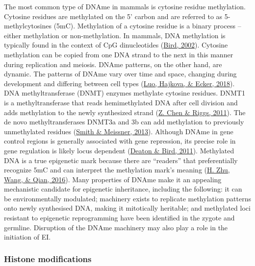 \documentclass[12pt,twoside]{reedthesis}
\begin{document}
The most common type of DNAme in mammals is cytosine residue
methylation. Cytosine residues are methylated on the 5' carbon and are
referred to as 5-methylcytosines (5mC). Methylation of a cytosine
residue is a binary process -- either methylation or non-methylation. In
mammals, DNA methylation is typically found in the context of CpG
dinucleotides (\protect\hyperlink{ref-bird2002}{Bird, 2002}). Cytosine methylation can be copied from one
DNA strand to the next in this manner during replication and meiosis.
DNAme patterns, on the other hand, are dynamic. The patterns of DNAme
vary over time and space, changing during development and differing
between cell types (\protect\hyperlink{ref-luo2018}{Luo, Hajkova, \& Ecker, 2018}). DNA methyltransferase (DNMT) enzymes
methylate cytosine residues. DNMT1 is a methyltransferase that reads
hemimethylated DNA after cell division and adds methylation to the newly
synthesized strand (\protect\hyperlink{ref-chen2011}{Z. Chen \& Riggs, 2011}). The de novo methyltransferases DNMT3a
and 3b can add methylation to previously unmethylated residues
(\protect\hyperlink{ref-smith2013}{Smith \& Meissner, 2013}). Although DNAme in gene control regions is generally
associated with gene repression, its precise role in gene regulation is
likely locus dependent (\protect\hyperlink{ref-deaton2011}{Deaton \& Bird, 2011}). Methylated DNA is a true
epigenetic mark because there are ``readers'' that preferentially
recognize 5mC and can interpret the methylation mark's meaning
(\protect\hyperlink{ref-zhu2016a}{H. Zhu, Wang, \& Qian, 2016}). Many properties of DNAme make it an appealing mechanistic
candidate for epigenetic inheritance, including the following: it can be
environmentally modulated; machinery exists to replicate methylation
patterns onto newly synthesised DNA, making it mitotically heritable;
and methylated loci resistant to epigenetic reprogramming have been
identified in the zygote and germline. Disruption of the DNAme machinery
may also play a role in the initiation of EI.

\hypertarget{histone-modifications}{%
\subsubsection*{Histone modifications}\label{histone-modifications}}
\end{document}
